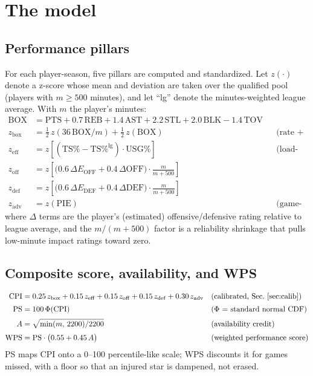 \documentclass[11pt]{article}
\begin{document}
\section{The model}
\label{sec:model}

\subsection{Performance pillars}
For each player-season, five pillars are computed and standardized. Let
$z(\cdot)$ denote a z-score whose mean and deviation are taken over the
qualified pool (players with $m \ge 500$ minutes), and let ``lg'' denote the
minutes-weighted league average. With $m$ the player's minutes:
\begin{align}
\mathrm{BOX} &= \mathrm{PTS} + 0.7\,\mathrm{REB} + 1.4\,\mathrm{AST}
  + 2.2\,\mathrm{STL} + 2.0\,\mathrm{BLK} - 1.4\,\mathrm{TOV} \\[2pt]
z_{\mathrm{box}} &= \tfrac12\, z\!\left(36\,\mathrm{BOX}/m\right)
  + \tfrac12\, z\!\left(\mathrm{BOX}\right)
  && \text{(rate + volume)} \\[2pt]
z_{\mathrm{eff}} &= z\!\left[(\mathrm{TS\%} - \mathrm{TS\%}^{\mathrm{lg}})
  \cdot \mathrm{USG\%}\right]
  && \text{(load-scaled efficiency)} \\[2pt]
z_{\mathrm{off}} &= z\!\left[\bigl(0.6\,\Delta E_{\mathrm{OFF}}
  + 0.4\,\Delta \mathrm{OFF}\bigr)\cdot \tfrac{m}{m+500}\right] \\[2pt]
z_{\mathrm{def}} &= z\!\left[\bigl(0.6\,\Delta E_{\mathrm{DEF}}
  + 0.4\,\Delta \mathrm{DEF}\bigr)\cdot \tfrac{m}{m+500}\right] \\[2pt]
z_{\mathrm{adv}} &= z\!\left(\mathrm{PIE}\right)
  && \text{(game-event share)}
\end{align}
where $\Delta$ terms are the player's (estimated) offensive/defensive rating
relative to league average, and the $m/(m+500)$ factor is a reliability
shrinkage that pulls low-minute impact ratings toward zero.

\subsection{Composite score, availability, and WPS}
\begin{align}
\mathrm{CPI} &= 0.25\,z_{\mathrm{box}} + 0.15\,z_{\mathrm{eff}}
  + 0.15\,z_{\mathrm{off}} + 0.15\,z_{\mathrm{def}} + 0.30\,z_{\mathrm{adv}}
  && \text{(calibrated, Sec.~\ref{sec:calib})} \\[2pt]
\mathrm{PS} &= 100\,\Phi(\mathrm{CPI})
  && \text{($\Phi$ = standard normal CDF)} \\[2pt]
A &= \sqrt{\min(m,\,2200)/2200}
  && \text{(availability credit)} \\[2pt]
\mathrm{WPS} &= \mathrm{PS}\cdot\bigl(0.55 + 0.45\,A\bigr)
  && \text{(weighted performance score)}
\end{align}
PS maps CPI onto a 0--100 percentile-like scale; WPS discounts it for games
missed, with a floor so that an injured star is dampened, not erased.
\end{document}
